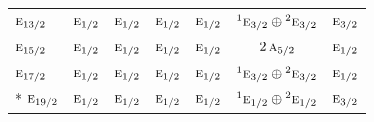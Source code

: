 \documentclass[10pt,a4paper]{article}
\numberwithin{equation}{section}
\newcommand{\irr}[1]{\text{\normalfont\scshape #1}}
\newcommand{\conjpair}[1]{{}^{#1}}
\begin{document}
{\begin{longtable}{@{}lcccccc@{}}
$\irr{e}_{13/2}$ & $\irr{e}_{1/2}$ & $\irr{e}_{1/2}$ & $\irr{e}_{1/2}$ & $\irr{e}_{1/2}$ & $\conjpair{1}\irr{e}_{3/2}\oplus \conjpair{2}\irr{e}_{3/2}$ & $\irr{e}_{3/2}$\\
$\irr{e}_{15/2}$ & $\irr{e}_{1/2}$ & $\irr{e}_{1/2}$ & $\irr{e}_{1/2}$ & $\irr{e}_{1/2}$ & $2\,\irr{a}_{5/2}$ & $\irr{e}_{1/2}$\\
$\irr{e}_{17/2}$ & $\irr{e}_{1/2}$ & $\irr{e}_{1/2}$ & $\irr{e}_{1/2}$ & $\irr{e}_{1/2}$ & $\conjpair{1}\irr{e}_{3/2}\oplus \conjpair{2}\irr{e}_{3/2}$ & $\irr{e}_{1/2}$\\*
$\irr{e}_{19/2}$ & $\irr{e}_{1/2}$ & $\irr{e}_{1/2}$ & $\irr{e}_{1/2}$ & $\irr{e}_{1/2}$ & $\conjpair{1}\irr{e}_{1/2}\oplus \conjpair{2}\irr{e}_{1/2}$ & $\irr{e}_{3/2}$\\
\bottomrule\end{longtable}}
\end{document}
